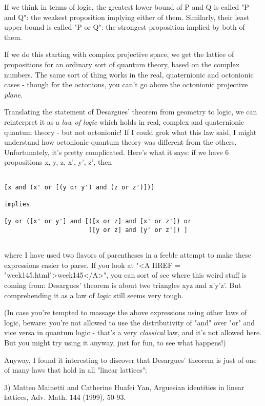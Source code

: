 If we think in terms of logic, the greatest lower bound of P and Q
is called "P and Q": the weakest proposition implying either of
them.  Similarly, their least upper bound is called "P or Q": the
strongest proposition implied by both of them.

If we do this starting with complex projective space, we get the lattice
of propositions for an ordinary sort of quantum theory, based on the
complex numbers.  The same sort of thing works in the real, quaternionic
and octonionic cases - though for the octonions, you can't go above the
octonionic projective \emph{plane}.

Translating the statement of Desargues' theorem from geometry to logic,
we can reinterpret it as a \emph{law of logic} which holds in real, complex
and quaternionic quantum theory - but not octonionic!  If I could grok
what this law said, I might understand how octonionic quantum theory was
different from the others.   Unfortunately, it's pretty complicated.
Here's what it says: if we have 6 propositions x, y, z, x', y', z', then


\begin{verbatim}

[x and (x' or [(y or y') and (z or z')])] 

implies

[y or ([x' or y'] and [([x or z] and [x' or z']) or
                       ([y or z] and [y' or z']) ]
                       
\end{verbatim}
    

where I have used two flavors of parentheses in a feeble attempt to make
these expressions easier to parse.  If you look at "<A HREF =
"week145.html">week145</A>", you can sort of see where this weird
stuff is coming from: Desargues' theorem is about two triangles xyz and
x'y'z'.  But comprehending it as a law of \emph{logic} still seems very
tough.


(In case you're tempted to massage the above expressions using other
laws of logic, beware: you're not allowed to use the distributivity of
"and" over "or" and vice versa in quantum logic -
that's a very \emph{classical} law, and it's not allowed here.  But
you might try using it anyway, just for fun, to see what happens!)

Anyway, I found it interesting to discover that Desargues' theorem is
just of one of many laws that hold in all "linear lattices":
 
3) Matteo Mainetti and Catherine Huafei Yan, Arguesian identities in
linear lattices, Adv. Math. 144 (1999), 50-93.

